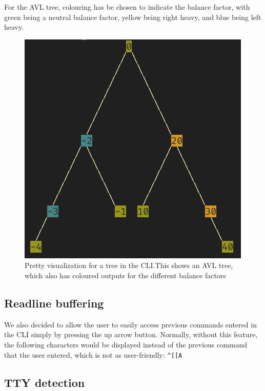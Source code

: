 \documentclass[letterpaper]{article}
\begin{document}
For the AVL tree, colouring has be chosen to indicate the balance
factor, with green being a neutral balance factor, yellow being right
heavy, and blue being left heavy.

\begin{figure}[H]
	\centering
	\includegraphics[width=.8\textwidth]{avl.png}
	\caption{Pretty visualization for a tree in the CLI.\@ This shows an AVL
		tree, which also has coloured outputs for the different balance factors}
\end{figure}


\subsection{Readline buffering}
We also decided to allow the user to easily access previous commands entered in
the CLI simply by pressing the up arrow button. Normally, without this feature,
the following characters would be displayed instead of the previous command that
the user entered, which is not as user-friendly:
\verb|^[[A|

\subsection{TTY detection}
\end{document}
